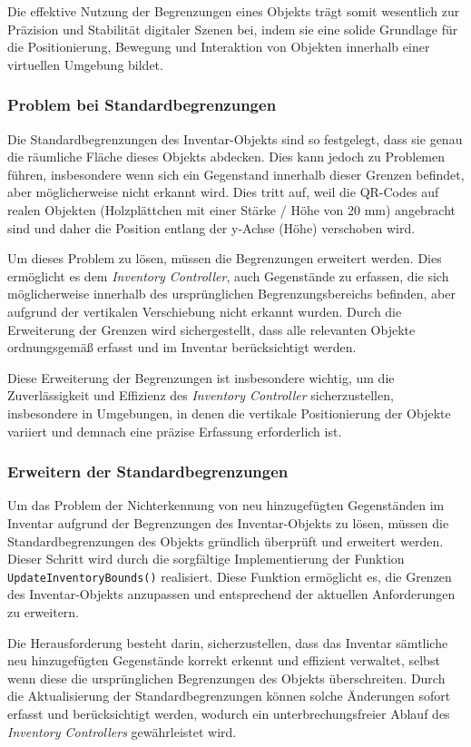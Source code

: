 Die effektive Nutzung der Begrenzungen eines Objekts trägt somit wesentlich zur Präzision und Stabilität digitaler
Szenen bei, indem sie eine solide Grundlage für die Positionierung, Bewegung und Interaktion von Objekten innerhalb
einer virtuellen Umgebung bildet.

\subsubsection{Problem bei Standardbegrenzungen}
Die Standardbegrenzungen des Inventar-Objekts sind so festgelegt, dass sie genau die räumliche Fläche dieses Objekts
abdecken. Dies kann jedoch zu Problemen führen, insbesondere wenn sich ein Gegenstand innerhalb dieser Grenzen befindet,
aber möglicherweise nicht erkannt wird. Dies tritt auf, weil die QR-Codes auf realen Objekten (Holzplättchen mit einer
Stärke / Höhe von 20 mm) angebracht sind und daher die Position entlang der y-Achse (Höhe) verschoben wird.

Um dieses Problem zu lösen, müssen die Begrenzungen erweitert werden. Dies ermöglicht es dem \textit{Inventory Controller},
auch Gegenstände zu erfassen, die sich möglicherweise innerhalb des ursprünglichen Begrenzungsbereichs befinden, aber
aufgrund der vertikalen Verschiebung nicht erkannt wurden. Durch die Erweiterung der Grenzen wird sichergestellt, dass
alle relevanten Objekte ordnungsgemäß erfasst und im Inventar berücksichtigt werden.

Diese Erweiterung der Begrenzungen ist insbesondere wichtig, um die Zuverlässigkeit und Effizienz des \textit{Inventory Controller}
sicherzustellen, insbesondere in Umgebungen, in denen die vertikale Positionierung der Objekte variiert und demnach eine
präzise Erfassung erforderlich ist.

\subsubsection{Erweitern der Standardbegrenzungen}
Um das Problem der Nichterkennung von neu hinzugefügten Gegenständen im Inventar aufgrund der Begrenzungen des Inventar-Objekts
zu lösen, müssen die Standardbegrenzungen des Objekts gründlich überprüft und erweitert werden. Dieser Schritt wird
durch die sorgfältige Implementierung der Funktion \texttt{UpdateInventoryBounds()} realisiert. Diese Funktion ermöglicht
es, die Grenzen des Inventar-Objekts anzupassen und entsprechend der aktuellen Anforderungen zu erweitern.

Die Herausforderung besteht darin, sicherzustellen, dass das Inventar sämtliche neu hinzugefügten Gegenstände korrekt
erkennt und effizient verwaltet, selbst wenn diese die ursprünglichen Begrenzungen des Objekts überschreiten. Durch die
Aktualisierung der Standardbegrenzungen können solche Änderungen sofort erfasst und berücksichtigt werden, wodurch ein
unterbrechungsfreier Ablauf des \textit{Inventory Controllers} gewährleistet wird.

